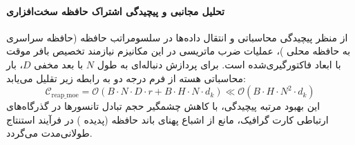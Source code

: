\paragraph{تحلیل مجانبی و پیچیدگی اشتراک حافظه سخت‌افزاری}
از منظر پیچیدگی محاسباتی و انتقال داده‌ها در سلسومراتب حافظه (حافظه سراسری  به حافظه محلی )، عملیات ضرب ماتریسی در این مکانیزم نیازمند تخصیص بافر موقت با ابعاد فاکتورگیری‌شده است. برای پردازش دنباله‌ای به طول $N$ با بعد مخفی $D$، بار محاسباتی هسته از فرم درجه دو به رابطه زیر تقلیل می‌یابد:
\begin{equation}
\label{eq:complexity_reap_moe}
\mathcal{C}_{\text{reap\_moe}} = \mathcal{O}\left( B \cdot N \cdot D \cdot r + B \cdot H \cdot N \cdot d_k \right) \ll \mathcal{O}\left( B \cdot H \cdot N^2 \cdot d_k \right)
\end{equation}
این بهبود مرتبه پیچیدگی، با کاهش چشمگیر حجم تبادل تانسورها در گذرگاه‌های ارتباطی کارت گرافیک، مانع از اشباع پهنای باند حافظه (پدیده ) در فرآیند استنتاج طولانی‌مدت می‌گردد.